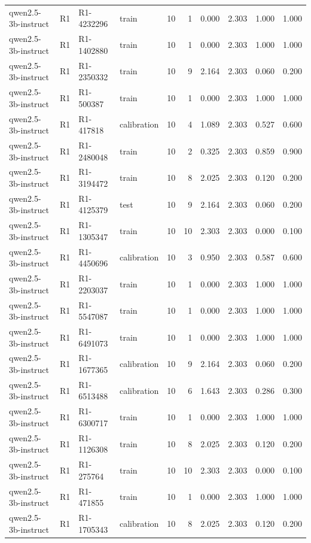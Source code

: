 \begin{table}
\begin{tabular}{llllrrrrrr}
qwen2.5-3b-instruct & R1 & R1-4232296 & train & 10 & 1 & 0.000 & 2.303 & 1.000 & 1.000 \\
qwen2.5-3b-instruct & R1 & R1-1402880 & train & 10 & 1 & 0.000 & 2.303 & 1.000 & 1.000 \\
qwen2.5-3b-instruct & R1 & R1-2350332 & train & 10 & 9 & 2.164 & 2.303 & 0.060 & 0.200 \\
qwen2.5-3b-instruct & R1 & R1-500387 & train & 10 & 1 & 0.000 & 2.303 & 1.000 & 1.000 \\
qwen2.5-3b-instruct & R1 & R1-417818 & calibration & 10 & 4 & 1.089 & 2.303 & 0.527 & 0.600 \\
qwen2.5-3b-instruct & R1 & R1-2480048 & train & 10 & 2 & 0.325 & 2.303 & 0.859 & 0.900 \\
qwen2.5-3b-instruct & R1 & R1-3194472 & train & 10 & 8 & 2.025 & 2.303 & 0.120 & 0.200 \\
qwen2.5-3b-instruct & R1 & R1-4125379 & test & 10 & 9 & 2.164 & 2.303 & 0.060 & 0.200 \\
qwen2.5-3b-instruct & R1 & R1-1305347 & train & 10 & 10 & 2.303 & 2.303 & 0.000 & 0.100 \\
qwen2.5-3b-instruct & R1 & R1-4450696 & calibration & 10 & 3 & 0.950 & 2.303 & 0.587 & 0.600 \\
qwen2.5-3b-instruct & R1 & R1-2203037 & train & 10 & 1 & 0.000 & 2.303 & 1.000 & 1.000 \\
qwen2.5-3b-instruct & R1 & R1-5547087 & train & 10 & 1 & 0.000 & 2.303 & 1.000 & 1.000 \\
qwen2.5-3b-instruct & R1 & R1-6491073 & train & 10 & 1 & 0.000 & 2.303 & 1.000 & 1.000 \\
qwen2.5-3b-instruct & R1 & R1-1677365 & calibration & 10 & 9 & 2.164 & 2.303 & 0.060 & 0.200 \\
qwen2.5-3b-instruct & R1 & R1-6513488 & calibration & 10 & 6 & 1.643 & 2.303 & 0.286 & 0.300 \\
qwen2.5-3b-instruct & R1 & R1-6300717 & train & 10 & 1 & 0.000 & 2.303 & 1.000 & 1.000 \\
qwen2.5-3b-instruct & R1 & R1-1126308 & train & 10 & 8 & 2.025 & 2.303 & 0.120 & 0.200 \\
qwen2.5-3b-instruct & R1 & R1-275764 & train & 10 & 10 & 2.303 & 2.303 & 0.000 & 0.100 \\
qwen2.5-3b-instruct & R1 & R1-471855 & train & 10 & 1 & 0.000 & 2.303 & 1.000 & 1.000 \\
qwen2.5-3b-instruct & R1 & R1-1705343 & calibration & 10 & 8 & 2.025 & 2.303 & 0.120 & 0.200 \\

\end{tabular}
\end{table}
